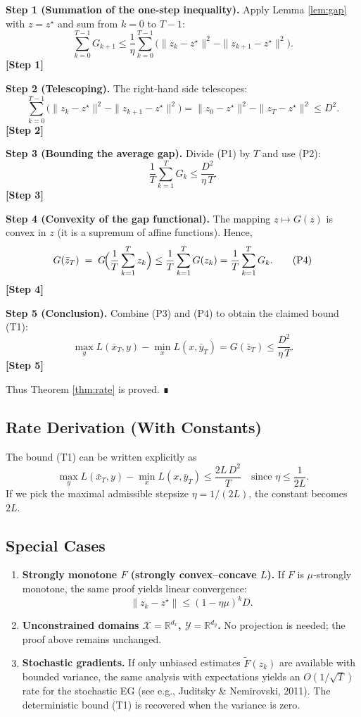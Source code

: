 \documentclass[11pt]{article}
\begin{document}
\noindent\textbf{Step 1 (Summation of the one‑step inequality).}  
Apply Lemma \ref{lem:gap} with $z=z^\star$ and sum from $k=0$ to $T-1$:
\[
\sum_{k=0}^{T-1} G_{k+1}
\le \frac{1}{\eta}\sum_{k=0}^{T-1}\bigl(\|z_k-z^\star\|^2-\|z_{k+1}-z^\star\|^2\bigr).
\tag{P1}
\]
\textbf{[Step 1]}

\noindent\textbf{Step 2 (Telescoping).}  
The right‑hand side telescopes:
\[
\sum_{k=0}^{T-1}\bigl(\|z_k-z^\star\|^2-\|z_{k+1}-z^\star\|^2\bigr)
= \|z_0-z^\star\|^2-\|z_T-z^\star\|^2\le D^{2}.
\tag{P2}
\]
\textbf{[Step 2]}

\noindent\textbf{Step 3 (Bounding the average gap).}  
Divide (P1) by $T$ and use (P2):
\[
\frac{1}{T}\sum_{k=1}^{T} G_{k}
\le \frac{D^{2}}{\eta\,T}.
\tag{P3}
\]
\textbf{[Step 3]}

\noindent\textbf{Step 4 (Convexity of the gap functional).}  
The mapping $z\mapsto G(z)$ is convex in $z$ (it is a supremum of affine functions). Hence,
\[
G(\bar z_T)\;=\;G\!\Bigl(\frac{1}{T}\sum_{k=1}^{T}z_k\Bigr)
\le \frac{1}{T}\sum_{k=1}^{T} G(z_k)
= \frac{1}{T}\sum_{k=1}^{T} G_{k}.
\tag{P4}
\]
\textbf{[Step 4]}

\noindent\textbf{Step 5 (Conclusion).}  
Combine (P3) and (P4) to obtain the claimed bound (T1):
\[
\max_{y}L(\bar x_T,y)-\min_{x}L(x,\bar y_T)
=G(\bar z_T)\le\frac{D^{2}}{\eta\,T}.
\tag{P5}
\]
\textbf{[Step 5]}

Thus Theorem \ref{thm:rate} is proved. ∎

\subsection*{Rate Derivation (With Constants)}
The bound (T1) can be written explicitly as
\[
\boxed{
\max_{y}L(\bar x_T,y)-\min_{x}L(x,\bar y_T)
\le \frac{2L\,D^{2}}{T}\quad\text{since }\eta\le\frac{1}{2L}.
}
\]
If we pick the maximal admissible stepsize $\eta=1/(2L)$,
the constant becomes $2L$.

\subsection*{Special Cases}
\begin{enumerate}
\item \textbf{Strongly monotone $F$ (strongly convex–concave $L$).}  
If $F$ is $\mu$‑strongly monotone, the same proof yields linear convergence:
\[
\|z_{k}-z^\star\|\le (1-\eta\mu)^k D.
\]
\item \textbf{Unconstrained domains $\mathcal X=\mathbb R^{d_x}$, $\mathcal Y=\mathbb R^{d_y}$.}  
No projection is needed; the proof above remains unchanged.
\item \textbf{Stochastic gradients.}  
If only unbiased estimates $\tilde F(z_k)$ are available with bounded variance,
the same analysis with expectations yields an $O(1/\sqrt{T})$ rate for the stochastic EG (see e.g., Juditsky \& Nemirovski, 2011).  
The deterministic bound (T1) is recovered when the variance is zero.
\end{enumerate}
\end{document}
